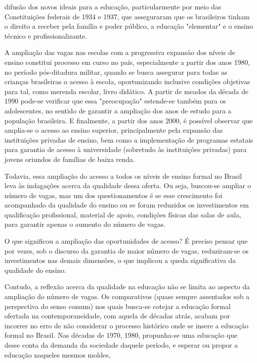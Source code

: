  difusão dos novos ideais para a educação, particularmente por meio das Constituições
 federais de 1934 e 1937, que asseguraram que os brasileiros tinham o direito a
 receber pela família e poder público, a educação "elementar" e o ensino técnico e
 profissionalizante.\par A ampliação das vagas nas escolas com a progressiva expansão dos níveis de ensino
 constitui processo em curso no país, especialmente a partir dos anos 1980, no período
 pós-ditadura militar, quando se busca assegurar para todas as crianças brasileiras o
 acesso à escola, oportunizando inclusive condições objetivas para tal, como merenda
 escolar, livro didático. A partir de meados da década de 1990 pode-se verificar que
 essa "preocupação" estende-se também para os adolescentes, no sentido de garantir a
 ampliação dos anos de estudo para a população brasileira. E finalmente, a partir dos
 anos 2000, é possível observar que amplia-se o acesso ao ensino superior,
 principalmente pela expansão das instituições privadas de ensino, bem como a
 implementação de programas estatais para garantia de acesso à universidade (sobretudo
 às instituições privadas) para jovens oriundos de famílias de baixa renda.\par Todavia, essa ampliação do acesso a todos os níveis de ensino formal no Brasil leva
 às indagações acerca da qualidade dessa oferta. Ou seja, buscou-se ampliar o número
 de vagas, mas um dos questionamentos é se esse crescimento foi acompanhado da
 qualidade do ensino ou se foram reduzidos os investimentos em qualificação
 profissional, material de apoio, condições físicas das salas de aula, para garantir
 apenas o aumento do número de vagas.\par O que significou a ampliação das oportunidades de acesso? É preciso pensar que por
 vezes, sob o discurso da garantia de maior número de vagas, reduziram-se os
 investimentos nas demais dimensões, o que implicou a queda significativa da qualidade
 do ensino.\par Contudo, a reflexão acerca da qualidade na educação não se limita ao aspecto da
 ampliação do número de vagas. Os comparativos (quase sempre assentados sob a
 perspectiva do senso comum) nos quais busca-se cotejar a educação formal ofertada na
 contemporaneidade, com aquela de décadas atrás, acabam por incorrer no erro de não
 considerar o processo histórico onde se insere a educação formal no Brasil. Nas
 décadas de 1970, 1980, propunha-se uma educação que desse conta da demanda da
 sociedade daquele período, e esperar ou propor a educação naqueles mesmos moldes,

